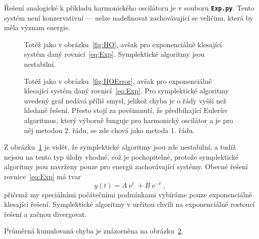 \documentclass[a4paper,11pt,twoside]{article}
\DeclareMathOperator{\e}{e}
\def\file#1{\textnormal{\textbf{\texttt{#1}}}}
\begin{document}
    \begin{solution}
        Řešení analogické k příkladu harmonického oscilátoru je v souboru \file{Exp.py}.
        Tento systém není konzervativní --- nelze nadefinovat zachovávající se veličinu, která by měla význam energie.

        \begin{figure}[!htbp]
            \centering
			\caption{
                \protect\small
                Totéž jako v obrázku~\ref{fig:HO}, avšak pro exponenciálně klesající systém daný rovnicí~\eqref{eq:Exp}.
                Symplektické algoritmy jsou nestabilní.
                }	
            \label{fig:Exp}
        \end{figure}
        
        \begin{figure}[!htbp]
            \centering
			\caption{
                \protect\small
                Totéž jako v obrázku~\ref{fig:HOError}, avšak pro exponenciálně klesající systém daný rovnicí~\eqref{eq:Exp}.
                Pro symplektické algoritmy uvedený graf nedává příliš smysl, jelikož chyba je o řády vyšší než hledané řešení.
                Přesto stojí za povšimnutí, že předbíhající Eulerův algoritmus, který výborně funguje pro harmonický oscilátor a je pro něj metodou 2. řádu, se zde chová jako metoda 1. řádu.
            }	
            \label{fig:ExpError}
        \end{figure}

        Z obrázku~\ref{fig:Exp} je vidět, že symplektické algoritmy jsou zde nestabilní, a tudíž nejsou na tento typ úlohy vhodné, což je pochopitelné, protože symplektické algoritmy jsou navrženy pouze pro energii zachovávající systémy.
        Obecné řešení rovnice~\eqref{eq:Exp} má tvar
        \begin{equation}
            y(t)=A\e^{t}+B\e^{-t},
        \end{equation}
        přičemž my speciálními počátečními podmínkami vybíráme pouze exponenciálně klesající řešení.
        Symplektické algoritmy v určitou chvíli  na exponenciálně rostoucí řešení a začnou divergovat.

        Průměrná kumulovaná chyba je znázorněna na obrázku~\ref{fig:ExpError}. 
    \end{solution}
\end{document}
